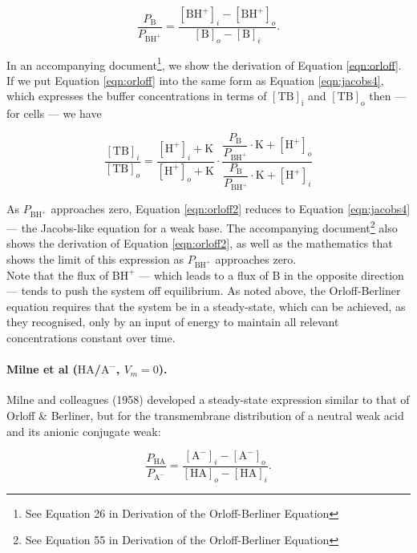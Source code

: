 \documentclass[fleqn,10pt]{physiome}
\begin{document}
\begin{equation}
\dfrac{P_\mathrm{B}}{P_\mathrm{BH^+}}=\dfrac{\mathrm{[BH^+]}_i-\mathrm{[BH^+]}_o}{\mathrm{[B]}_o-\mathrm{[B]}_i}.
\label{eqn:orloff}
\end{equation}

In an accompanying document\footnote{See Equation 26 in Derivation of the Orloff-Berliner Equation}, we show the derivation of Equation \ref{eqn:orloff}. If we put Equation \ref{eqn:orloff} into the same form as Equation \ref{eqn:jacobs4}, which expresses the buffer concentrations in terms of $\mathrm{[TB]_i}$ and $\mathrm{[TB]_o}$ then --- for cells --- we have

\begin{equation}
\dfrac{\mathrm{[TB]}_i}{\mathrm{[TB]}_o}=\dfrac{\mathrm{[H^+]}_i+\mathrm{K}}{\mathrm{[H^+]}_o+\mathrm{K}}\cdot \dfrac{\dfrac{P_\mathrm{B}}{P_\mathrm{BH^+}}\cdot\mathrm{K}+\mathrm{[H^+]}_o}{\dfrac{P_\mathrm{B}}{P_\mathrm{BH^+}}\cdot\mathrm{K}+\mathrm{[H^+]}_i}
\label{eqn:orloff2}
\end{equation}

As $P_\mathrm{BH^+}$ approaches zero, Equation \ref{eqn:orloff2} reduces to Equation \ref{eqn:jacobs4} --- the Jacobs-like equation for a weak base. The accompanying document\footnote{See Equation 55 in Derivation of the Orloff-Berliner Equation} also shows the derivation of Equation \ref{eqn:orloff2}, as well as the mathematics that shows the limit of this expression as $P_\mathrm{BH^+}$ approaches zero.\\

Note that the flux of $\mathrm{BH^+}$ --- which leads to a flux of $\mathrm{B}$ in the opposite direction --- tends to push the system off equilibrium. As noted above, the Orloff-Berliner equation requires that the system be in a steady-state, which can be achieved, as they recognised, only by an input of energy to maintain all relevant concentrations constant over time.

\paragraph{Milne et al ($\mathrm{HA}$/$\mathrm{A^-}$, $V_m=0$).} Milne and colleagues (1958) developed a steady-state expression similar to that of Orloff \& Berliner, but for the transmembrane distribution of a neutral weak acid and its anionic conjugate weak:

\begin{equation}
\dfrac{P_\mathrm{HA}}{P_\mathrm{A^-}}=\dfrac{\mathrm{[A^-]}_i-\mathrm{[A^-]}_o}{\mathrm{[HA]}_o-\mathrm{[HA]}_i}.
\label{eqn:milne}
\end{equation}
\end{document}

